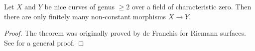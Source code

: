 \begin{theorem}[de Franchis]\label{thm:deFranchis}
Let $X$ and $Y$ be nice curves of genus $\geqslant 2$ over a field of 
characteristic zero. Then there are only finitely many non-constant morphisms 
$X\to Y$.  
\end{theorem}
\begin{proof}
The theorem was originally proved by de Franchis for Riemann surfaces. See 
\cite[p.29]{la60} for a general proof. 
\end{proof}









